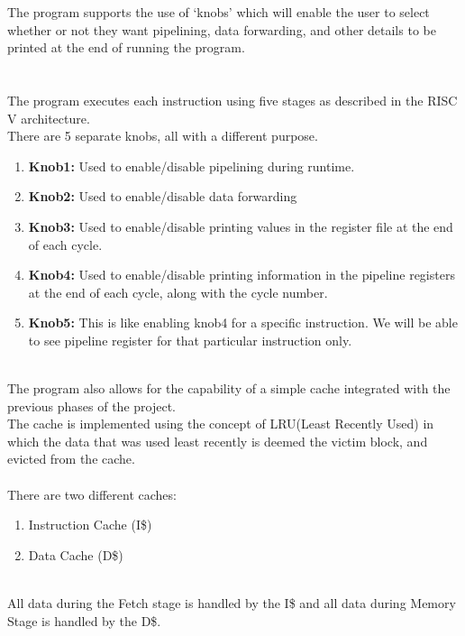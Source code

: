 \documentclass{article}
\begin{document}
The program supports the use of `knobs' which will enable the user to select whether or not they want pipelining, data forwarding, and other details to be printed at the end of running the program.\\\\\\
The program executes each instruction using five stages as described in the RISC V architecture.\\
\newpage
There are 5 separate knobs, all with a different purpose.\\
\begin{enumerate}
  \item {\bf Knob1:} Used to enable/disable pipelining during runtime. 
  \item {\bf Knob2:} Used to enable/disable data forwarding
  \item {\bf Knob3:} Used to enable/disable printing values in the register file at the end of each cycle.
  \item {\bf Knob4:} Used to enable/disable printing information in the pipeline registers at the end of each cycle, along with the cycle number.
  \item {\bf Knob5:} This is like enabling knob4 for a specific instruction. We will be able to see pipeline register for that particular instruction only.
\end{enumerate}\\
The program also allows for the capability of a simple cache integrated with the previous phases of the project.\\
The cache is implemented using the concept of LRU(Least Recently Used) in which the data that was used least recently is deemed the victim block, and evicted from the cache.\\\\
There are two different caches:
\begin{enumerate}
    \item Instruction Cache (I\$)
    \item Data Cache (D\$)
\end{enumerate}\\
\vspace{1cm}All data during the Fetch stage is handled by the I\$ and all data during Memory Stage is handled by the D\$.\\
\end{document}
